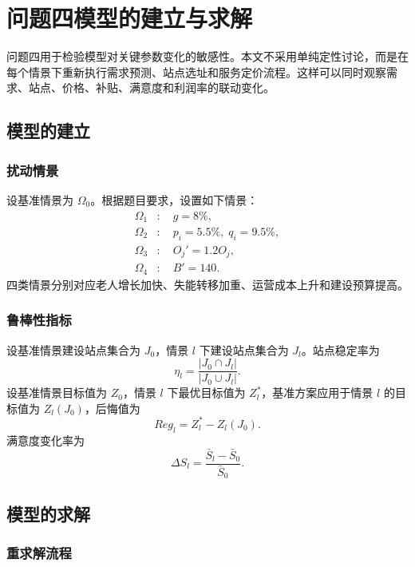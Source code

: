 \section{问题四模型的建立与求解}

问题四用于检验模型对关键参数变化的敏感性。本文不采用单纯定性讨论，而是在每个情景下重新执行需求预测、站点选址和服务定价流程。这样可以同时观察需求、站点、价格、补贴、满意度和利润率的联动变化。

\subsection{模型的建立}

\subsubsection{扰动情景}

设基准情景为 $\Omega_0$。根据题目要求，设置如下情景：
\begin{align}
\Omega_1 &: \quad g=8\%,\\
\Omega_2 &: \quad p_i=5.5\%,\;q_i=9.5\%,\\
\Omega_3 &: \quad O_j'=1.2O_j,\\
\Omega_4 &: \quad B'=140.
\end{align}
四类情景分别对应老人增长加快、失能转移加重、运营成本上升和建设预算提高。

\subsubsection{鲁棒性指标}

设基准情景建设站点集合为 $J_0$，情景 $l$ 下建设站点集合为 $J_l$。站点稳定率为
\begin{equation}
\eta_l=\frac{|J_0\cap J_l|}{|J_0\cup J_l|}.
\end{equation}
设基准情景目标值为 $Z_0$，情景 $l$ 下最优目标值为 $Z_l^*$，基准方案应用于情景 $l$ 的目标值为 $Z_l(J_0)$，后悔值为
\begin{equation}
Reg_l=Z_l^*-Z_l(J_0).
\end{equation}
满意度变化率为
\begin{equation}
\Delta S_l=\frac{\bar{S}_l-\bar{S}_0}{\bar{S}_0}.
\end{equation}

\subsection{模型的求解}

\subsubsection{重求解流程}

